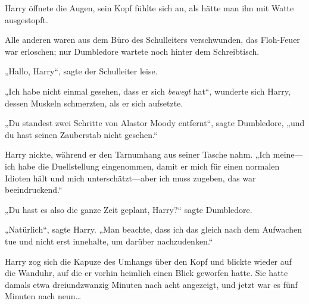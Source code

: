 \later

Harry öffnete die Augen, sein Kopf fühlte sich an, als hätte man ihn mit Watte ausgestopft.

Alle anderen waren aus dem Büro des Schulleiters verschwunden, das Floh-Feuer war erloschen; nur Dumbledore wartete noch hinter dem Schreibtisch.

„Hallo, Harry“, sagte der Schulleiter leise.

„Ich habe nicht einmal gesehen, dass er sich \emph{bewegt} hat“, wunderte sich Harry, dessen Muskeln schmerzten, als er sich aufsetzte.

„Du standest zwei Schritte von Alastor Moody entfernt“, sagte Dumbledore, „und du hast seinen Zauberstab nicht gesehen.“

Harry nickte, während er den Tarnumhang aus seiner Tasche nahm. „Ich meine—ich habe die Duellstellung eingenommen, damit er mich für einen normalen Idioten hält und mich unterschätzt—aber ich muss zugeben, das war beeindruckend.“

„Du hast es also die ganze Zeit geplant, Harry?“ sagte Dumbledore.

„Natürlich“, sagte Harry. „Man beachte, dass ich das gleich nach dem Aufwachen tue und nicht erst innehalte, um darüber nachzudenken.“


Harry zog sich die Kapuze des Umhangs über den Kopf und blickte wieder auf die Wanduhr, auf die er vorhin heimlich einen Blick geworfen hatte. Sie hatte damals etwa dreiundzwanzig Minuten nach acht angezeigt, und jetzt war es fünf Minuten nach neun…

